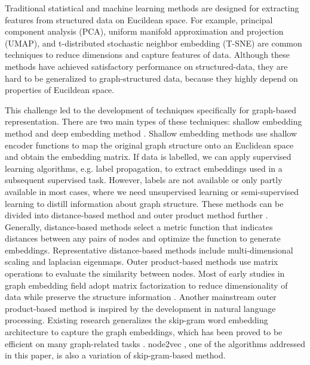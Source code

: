 \documentclass[sigconf]{acmart}
\begin{document}
Traditional statistical and machine learning methods are designed for extracting features from structured data on Eucildean space. For example, principal component analysis (PCA), uniform manifold approximation and projection (UMAP), and t-distributed stochastic neighbor embedding (T-SNE) are common techniques to reduce dimensions and capture features of data. Although these methods have achieved satisfactory performance on structured-data, they are hard to be generalized to graph-structured data, because they highly depend on properties of Eucildean space.\par

This challenge led to the development of techniques specifically for graph-based representation. There are two main types of these techniques: shallow embedding method and deep embedding method \cite{murphy2022}. Shallow embedding methods use shallow encoder functions to map the original graph structure onto an Euclidean space and obtain the embedding matrix. If data is labelled, we can apply supervised learning algorithms, e.g. label propagation, to extract embeddings used in a subsequent supervised task. However, labels are not available or only partly available in most cases, where we need unsupervised learning or semi-supervised learning to distill information about graph structure. These methods can be divided into distance-based method and outer product method further \cite{murphy2022}. Generally, distance-based methods select a metric function that indicates distances between any pairs of nodes and optimize the function to generate embeddings. Representative distance-based methods include multi-dimensional scaling and laplacian eigenmaps. Outer product-based methods use matrix operations to evaluate the similarity between nodes. Most of early studies in graph embedding field adopt matrix factorization to reduce dimensionality of data while preserve the structure information \cite{cai2018}. Another mainstream outer product-based method is inspired by the development in natural language processing. Existing research generalizes the skip-gram word embedding architecture to capture the graph embeddings, which has been proved to be efficient on many graph-related tasks \cite{deepwalk}\cite{line}. node2vec \cite{node2vec}, one of the algorithms addressed in this paper, is also a variation of skip-gram-based method.\par
\end{document}
